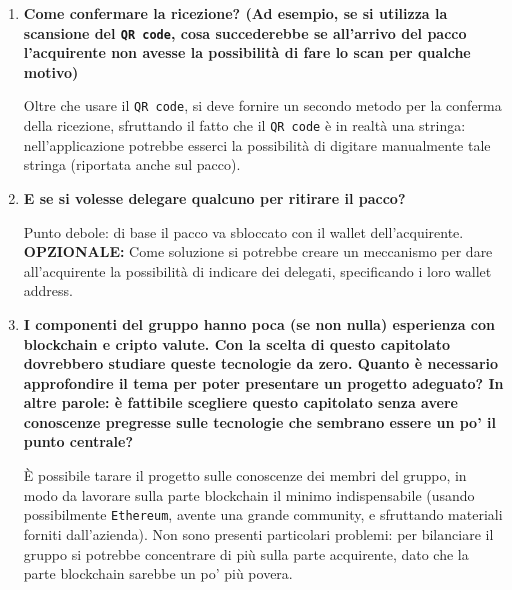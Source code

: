 \documentclass[11pt]{article}
\begin{document}
\begin{enumerate}
				\bigskip
				
				\item \textbf{Come confermare la ricezione? (Ad esempio, se si utilizza la scansione del \texttt{QR code}, cosa
				succederebbe se all'arrivo del pacco l'acquirente non avesse la possibilità di fare lo scan per qualche motivo)}
				
				\medskip
				
				Oltre che usare il \texttt{QR code}, si deve fornire un secondo metodo per la conferma della ricezione, sfruttando il fatto
				che il \texttt{QR code} è in realtà una stringa: nell'applicazione potrebbe esserci la possibilità di digitare manualmente
				tale stringa (riportata anche sul pacco).
				
				\bigskip
				
				\item \textbf{E se si volesse delegare qualcuno per ritirare il pacco?}
				
				\medskip
				
				Punto debole: di base il pacco va sbloccato con il wallet dell'acquirente.\\
				\textbf{OPZIONALE:} Come soluzione si potrebbe creare un meccanismo per dare all'acquirente la possibilità di indicare
				dei delegati, specificando i loro wallet address.
				
				\bigskip
				
				\item \textbf{I componenti del gruppo hanno poca (se non nulla) esperienza con blockchain e cripto valute.
				Con la scelta di questo capitolato dovrebbero studiare queste tecnologie da zero.
				Quanto è necessario approfondire il tema per poter presentare un progetto adeguato?
				In altre parole: è fattibile scegliere questo capitolato senza avere conoscenze pregresse sulle tecnologie
				che sembrano essere un po' il punto centrale?}
				
				\medskip
				
				È possibile tarare il progetto sulle conoscenze dei membri del gruppo, in modo da lavorare sulla parte blockchain
				il minimo indispensabile (usando possibilmente \texttt{Ethereum}, avente una grande community, e sfruttando
				materiali forniti dall'azienda).
				Non sono presenti particolari problemi: per bilanciare il gruppo si potrebbe concentrare di più sulla
				parte acquirente, dato che la parte blockchain sarebbe un po' più povera.
			\end{enumerate}
\end{document}
